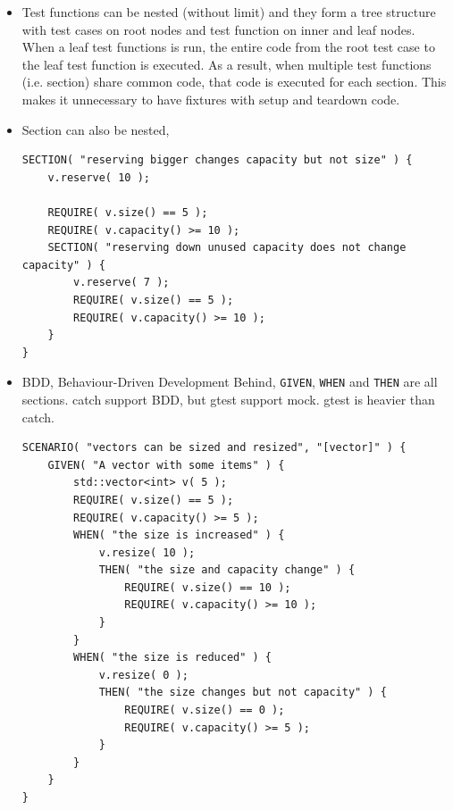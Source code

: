 \documentclass[a4paper,11pt,twoside]{book}
\begin{document}
\begin{itemize}
	\item Test functions can be nested (without limit) and they form a tree structure with test cases on root nodes and test function on inner and leaf nodes. When a leaf test functions is run, the entire code from the root test case to the leaf test function is executed. As a result, when multiple test functions (i.e. section) share common code, that code is executed for each section. This makes it unnecessary to have fixtures with setup and teardown code.

	\item Section can also be nested,
\begin{lstlisting}
SECTION( "reserving bigger changes capacity but not size" ) {
	v.reserve( 10 );
	
	REQUIRE( v.size() == 5 );
	REQUIRE( v.capacity() >= 10 );
	SECTION( "reserving down unused capacity does not change capacity" ) {
		v.reserve( 7 );
		REQUIRE( v.size() == 5 );
		REQUIRE( v.capacity() >= 10 );
	}
}
\end{lstlisting}


%

	\item BDD, Behaviour-Driven Development  Behind, \texttt{GIVEN}, \texttt{WHEN} and \texttt{THEN} are all sections. catch support BDD, but gtest support mock. gtest is heavier than catch.

\begin{lstlisting}
SCENARIO( "vectors can be sized and resized", "[vector]" ) {	
	GIVEN( "A vector with some items" ) {
		std::vector<int> v( 5 );		
		REQUIRE( v.size() == 5 );
		REQUIRE( v.capacity() >= 5 );
		WHEN( "the size is increased" ) {
			v.resize( 10 );
			THEN( "the size and capacity change" ) {
				REQUIRE( v.size() == 10 );
				REQUIRE( v.capacity() >= 10 );
			}
		}
		WHEN( "the size is reduced" ) {
			v.resize( 0 );
			THEN( "the size changes but not capacity" ) {
				REQUIRE( v.size() == 0 );
				REQUIRE( v.capacity() >= 5 );
			}
		}
	}
}
\end{lstlisting}

\end{itemize}
\end{document}
